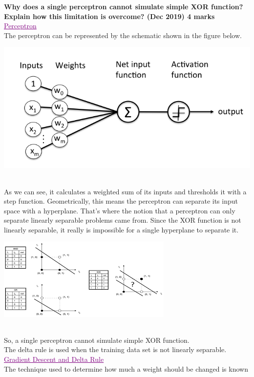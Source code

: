 \textbf{\textcolor{LightMagenta}{ Why does a single perceptron cannot simulate simple XOR function? Explain how this limitation is overcome? (Dec 2019) \hfill 4 marks}} \\[5pt]

\textcolor{purple}{\underline{Perceptron}} \\
The perceptron can be represented by the schematic shown in the figure below.
\begin{center}
    \includegraphics[width=.8\textwidth]{Images/A22_img1.png}
\end{center}
\\
As we can see, it calculates a weighted sum of its inputs and thresholds it with a step function. Geometrically, this means the perceptron can separate its input space with a hyperplane. That’s where the notion that a perceptron can only separate linearly separable problems came from. Since the XOR function is not linearly separable, it really is impossible for a single hyperplane to separate it.
\\
\begin{center}
    \includegraphics{Images/A22_img2.png}
\end{center}
\\
So, a single perceptron cannot simulate simple XOR function.
\\
The delta rule is used when the training
data set is not linearly separable.
\\
\textcolor{purple}{\underline{Gradient Descent and Delta Rule}} \\
The technique used to determine how much a weight should be changed is known
